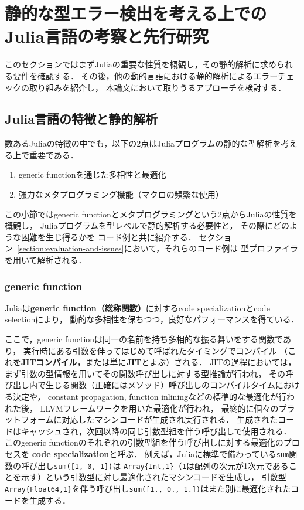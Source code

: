
\section{静的な型エラー検出を考える上でのJulia言語の考察と先行研究}

このセクションではまずJuliaの重要な性質を概観し，その静的解析に求められる要件を確認する．
その後，他の動的言語における静的解析によるエラーチェックの取り組みを紹介し，
本論文において取りうるアプローチを検討する．


\subsection{Julia言語の特徴と静的解析}

数あるJuliaの特徴の中でも，以下の2点はJuliaプログラムの静的な型解析を考える上で重要である．

\begin{enumerate}
  \item generic functionを通じた多相性と最適化
  \item 強力なメタプログラミング機能（マクロの頻繁な使用）
\end{enumerate}

この小節ではgeneric functionとメタプログラミングという2点からJuliaの性質を概観し，
Juliaプログラムを型レベルで静的解析する必要性と，
その際にどのような困難を生じ得るかを
コード例と共に紹介する．
セクション~\ref{section:evaluation-and-issues}において，それらのコード例は
型プロファイラを用いて解析される．

\subsubsection{generic function} \label{subsubsection:generic-function}

Juliaは\textbf{generic function（総称関数）}に対するcode specializationとcode selectionにより，
動的な多相性を保ちつつ，良好なパフォーマンスを得ている\cite{jeff-phd}．

ここで，generic functionは同一の名前を持ち多相的な振る舞いをする関数であり，
実行時にある引数を伴ってはじめて呼ばれたタイミングでコンパイル
（これを\textbf{JITコンパイル}，または単に\textbf{JIT}とよぶ）される．
JITの過程においては，まず引数の型情報を用いてその関数呼び出しに対する型推論が行われ，
その呼び出し内で生じる関数（正確にはメソッド）呼び出しのコンパイルタイムにおける決定や，
constant propagation, function inliningなどの標準的な最適化が行われた後，
LLVMフレームワーク\cite{LLVM}を用いた最適化が行われ，
最終的に個々のプラットフォームに対応したマシンコードが生成され実行される．
生成されたコードはキャッシュされ，次回以降の同じ引数型組を伴う呼び出しで使用される．
このgeneric functionのそれぞれの引数型組を伴う呼び出しに対する最適化のプロセスを
\textbf{code specialization}と呼ぶ．
例えば，Juliaに標準で備わっている\verb|sum|関数の呼び出し\verb|sum([1, 0, 1])|は
\verb|Array{Int,1}|（\verb|1|は配列の次元が1次元であることを示す）という引数型に対し最適化されたマシンコードを生成し，
引数型\verb|Array{Float64,1}|を伴う呼び出し\verb|sum([1., 0., 1.])|はまた別に最適化されたコードを生成する．

